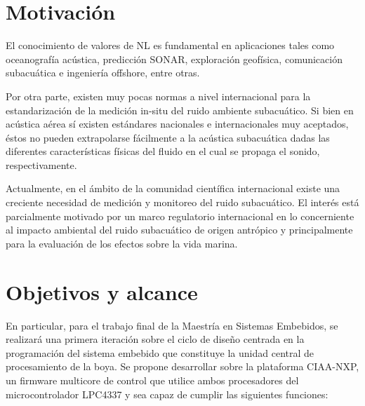 


\section{Motivación}


El conocimiento de valores de NL es fundamental en aplicaciones tales como oceanografía acústica, predicción SONAR, exploración geofísica, comunicación subacuática e ingeniería offshore, entre otras.

Por otra parte, existen muy pocas normas a nivel internacional para la estandarización de la medición in-situ del ruido ambiente subacuático. Si bien en acústica aérea sí existen estándares nacionales e internacionales muy aceptados, éstos no pueden extrapolarse fácilmente a la acústica subacuática dadas las diferentes características físicas del fluido en el cual se propaga el sonido, respectivamente.

Actualmente, en el ámbito de la comunidad científica internacional existe una creciente necesidad de medición y monitoreo del ruido subacuático. El interés está parcialmente motivado por un marco regulatorio internacional en lo concerniente al impacto ambiental del ruido subacuático de origen antrópico y principalmente para la evaluación de los efectos sobre la vida marina.



\section{Objetivos y alcance}


En particular, para el trabajo final de la Maestría en Sistemas Embebidos, se realizará una primera iteración sobre el ciclo de diseño centrada en la programación del sistema embebido que constituye la unidad central de procesamiento de la boya.  Se propone desarrollar sobre la plataforma CIAA-NXP, un firmware multicore de control que utilice ambos procesadores del microcontrolador LPC4337 y sea capaz de cumplir las siguientes funciones:

